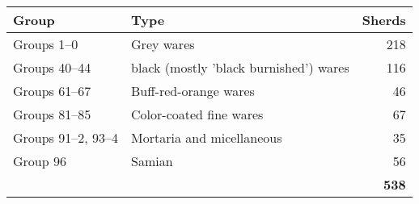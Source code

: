 \documentclass[11pt,a4paper]{article}
\begin{document}
\begin{tabular}{|l|p{1in}|r|} 
\hline
\bf{Group}&\bf{Type}&\bf{Sherds} \\
\hline
Groups 1--0 &Grey wares&218\\
Groups 40--44 &black (mostly 'black burnished') wares &116\\
Groups 61--67 &Buff-red-orange wares & 46\\
Groups 81--85 &Color-coated fine wares & 67\\
Groups 91--2, 93--4&Mortaria and micellaneous & 35 \\
Group 96 &Samian & 56 \\  
\hline
      &&\bf{538} \\
\hline
\end{tabular}
\end{document}
